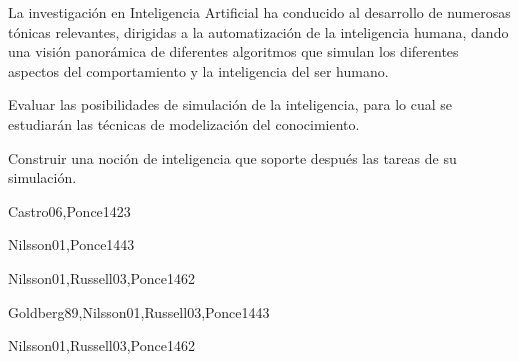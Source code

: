 \begin{syllabus}


\begin{justification}
La investigación en Inteligencia Artificial ha conducido al desarrollo de
numerosas tónicas relevantes, dirigidas a la automatización de la
inteligencia humana, dando una visión panorámica de diferentes
algoritmos que simulan los diferentes aspectos del comportamiento
y la inteligencia del ser humano.
\end{justification}

\begin{goals}
\item Evaluar las posibilidades de simulación de la inteligencia, para lo cual se estudiarán las técnicas de modelización del conocimiento.
\item Construir una noción de inteligencia que soporte después las tareas de su simulación.
\end{goals}

\begin{outcomes}
\end{outcomes}

\begin{unit}{\ISFundamentalIssuesDef}{Castro06,Ponce14}{2}{3}
    \ISFundamentalIssuesAllTopics
    \ISFundamentalIssuesAllObjectives
\end{unit}

\begin{unit}{\ISBasicSearchStrategiesDef}{Nilsson01,Ponce14}{4}{3}
    \ISBasicSearchStrategiesAllTopics
    \ISBasicSearchStrategiesAllObjectives
\end{unit}

\begin{unit}{\ISKnowledgementBasedReasoningDef}{Nilsson01,Russell03,Ponce14}{6}{2}
    \ISKnowledgementBasedReasoningAllTopics
    \ISKnowledgementBasedReasoningAllObjectives
\end{unit}

\begin{unit}{\ISAdvancedSearchDef}{Goldberg89,Nilsson01,Russell03,Ponce14}{4}{3}
     \ISAdvancedSearchAllTopics
     \ISAdvancedSearchAllObjectives
\end{unit}

\begin{unit}{\ISAdvancedReasoningDef}{Nilsson01,Russell03,Ponce14}{6}{2}
    \ISAdvancedReasoningAllTopics
    \ISAdvancedReasoningAllObjectives
\end{unit}


\end{syllabus}
